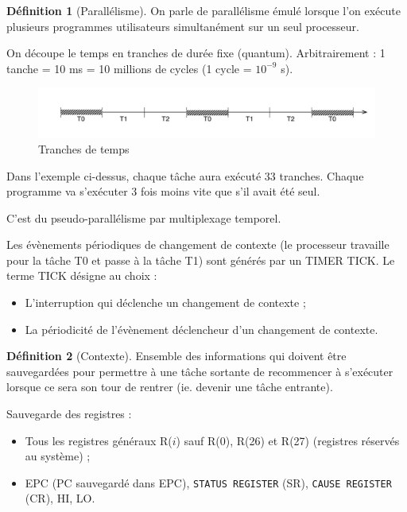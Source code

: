 \documentclass[11pt,english,french]{scrreprt}
\theoremstyle{remark}
\theoremstyle{definition}
\newtheorem*{def*}{Définition}
\begin{document}
\begin{def*}[Parallélisme]
	On parle de parallélisme émulé lorsque l'on exécute plusieurs programmes utilisateurs simultanément sur un seul processeur.
\end{def*}

On découpe le temps en tranches de durée fixe (quantum). Arbitrairement : 1 tanche = 10 ms = 10 millions de cycles (1 cycle = $10^{-9}$ s).

\begin{figure}[!h]
	\center
	\includegraphics[scale=.75]{diagrammes/tranches}
	\caption{Tranches de temps}
\end{figure}

Dans l'exemple ci-dessus, chaque tâche aura exécuté 33 tranches.
Chaque programme va s'exécuter 3 fois moins vite que s'il avait été seul.

C'est du pseudo-parallélisme par multiplexage temporel.

Les évènements périodiques de changement de contexte (le processeur travaille pour la tâche T0 et passe à la tâche T1) sont générés par un TIMER TICK. Le terme TICK désigne au choix :\begin{itemize}
	\item L'interruption qui déclenche  un changement de contexte ;
	\item La périodicité de l'évènement déclencheur d'un changement de contexte.
\end{itemize}

\begin{def*}[Contexte]
	Ensemble des informations qui doivent être sauvegardées pour permettre à une tâche sortante de recommencer à s'exécuter lorsque ce sera son tour de rentrer (ie. devenir une tâche entrante).
	
	Sauvegarde des registres :\begin{itemize}
		\item Tous les registres généraux R($i$) sauf R(0), R(26) et R(27) (registres réservés au système) ;
		\item EPC (PC sauvegardé dans EPC), \lstinline!STATUS REGISTER! (SR), \lstinline!CAUSE REGISTER! (CR), HI, LO.
	\end{itemize}
\end{def*}
\end{document}
